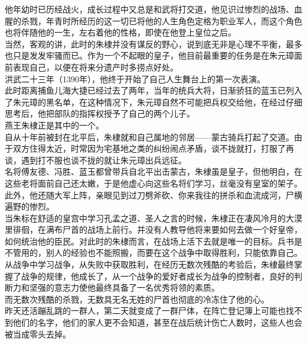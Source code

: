 \begin{multicols}{\theparacolNo}
他年幼时已历经战火，成长过程中又总是和武将打交道，他见识过惨烈的战场、血腥的杀戮，年青时所经历的这一切已将他的人生角色定格为职业军人，而这个角色也将伴随他的一生，左右着他的性格，即使在他登上皇位之后。\\

当然，客观的讲，此时的朱棣并没有谋反的野心，说到底无非是心理不平衡，最多也只是发发牢骚而已。作为一个不起眼的皇子，他目前最重要的任务是在朱元璋面前表现自己，以便在将来分遗产时多捞点好处。\\

洪武二十三年（1390年），他终于开始了自己人生舞台上的第一次表演。\\

此时距离捕鱼儿海大捷已经过去了两年，当年的统兵大将，日渐骄狂的蓝玉已列入了朱元璋的黑名单，在这种情况下，朱元璋自然不可能把兵权交给他，在经过仔细思考后，他把部队的指挥权授予了自己的两个儿子。\\

燕王朱棣正是其中的一个。\\

自从十年前被封在北平后，朱棣就和自己属地的邻居——蒙古骑兵打起了交道。由于双方住得太近，时常因为宅基地之类的纠纷闹点矛盾，谈不拢就打，打服了再谈，遇到打不服也谈不拢的就让朱元璋出兵远征。\\

名将傅友德、冯胜、蓝玉都曾带兵自北平出击蒙古，朱棣虽是皇子，但他明白，在这些老将面前自己还太嫩，于是他虚心向这些名将们学习，丝毫没有皇室的架子。此外，他还随大军上阵，亲眼见到过刀劈斧砍、你来我往的拼杀和血流成河，尸横遍野的惨烈。\\

当朱标在舒适的皇宫中学习孔孟之道、圣人之言的时候，朱棣正在凄风冷月的大漠里徘徊，在满布尸首的战场上前行。并没有人教导他将来要如何去做一个好皇帝，如何统治他的臣民。对此时的朱棣而言，在战场上活下去就是唯一的目标。兵书是不管用的，别人的经验也不能照搬，而要在这个战争中取得胜利，只能依靠自己。\\

从战争中学习战争，从失败中获取胜利，在经历无数次残酷的考验后，朱棣最终掌握了战争的规律，他成长了，从一个战争的爱好者成长为战争的控制者，良好的判断力和坚强的意志力使他最终具备了一名优秀将领的素质。\\

而无数次残酷的杀戮，无数具无名无姓的尸首也彻底的冷冻住了他的心。\\

昨天还活蹦乱跳的一群人，第二天就变成了一群尸体，在阵亡登记簿上可能也找不到他们的名字，他们的家人更不会知道，甚至在战后统计伤亡人数时，这些人也会被当成零头去掉。\\


\end{multicols}
